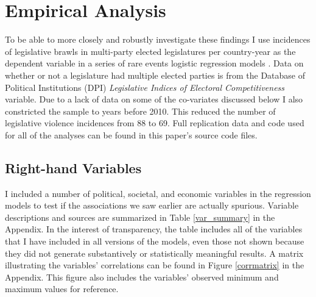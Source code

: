 \documentclass[a4paper]{article}\usepackage{graphicx, color}
\begin{document}
\section{Empirical Analysis}

To be able to more closely and robustly investigate these findings I use incidences of legislative brawls in multi-party elected legislatures per country-year as the dependent variable in a series of rare events logistic regression models \citep{KingRareEvents2001, KingRareEventsPA2001}. Data on whether or not a legislature had multiple elected parties is from the Database of Political Institutions (DPI) \citep[updated to 2010]{DPI2001} {\emph{Legislative Indices of Electoral Competitiveness}} variable. Due to a lack of data on some of the co-variates discussed below I also constricted the sample to years before 2010. This reduced the number of legislative violence incidences from 88 to 69. Full replication data and code used for all of the analyses can be found in this paper's source code files.

\subsection{Right-hand Variables}

I included a number of political, societal, and economic variables in the regression models to test if the associations we saw earlier are actually spurious. Variable descriptions and sources are summarized in Table \ref{var_summary} in the Appendix. In the interest of transparency, the table includes all of the variables that I have included in all versions of the models, even those not shown because they did not generate substantively or statistically meaningful results. A matrix illustrating the variables' correlations can be found in Figure \ref{corrmatrix} in the Appendix. This figure also includes the variables' observed minimum and maximum values for reference. 
\end{document}
